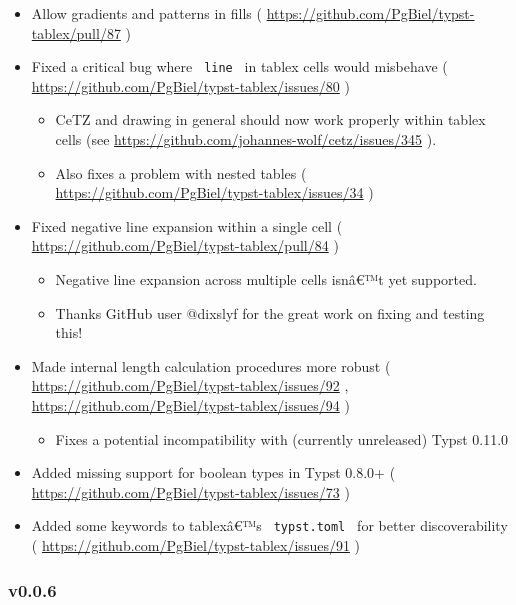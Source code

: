 \begin{itemize}
\tightlist
\item
  Allow gradients and patterns in fills (
  \url{https://github.com/PgBiel/typst-tablex/pull/87} )
\item
  Fixed a critical bug where \texttt{\ line\ } in tablex cells would
  misbehave ( \url{https://github.com/PgBiel/typst-tablex/issues/80} )

  \begin{itemize}
  \tightlist
  \item
    CeTZ and drawing in general should now work properly within tablex
    cells (see \url{https://github.com/johannes-wolf/cetz/issues/345} ).
  \item
    Also fixes a problem with nested tables (
    \url{https://github.com/PgBiel/typst-tablex/issues/34} )
  \end{itemize}
\item
  Fixed negative line expansion within a single cell (
  \url{https://github.com/PgBiel/typst-tablex/pull/84} )

  \begin{itemize}
  \tightlist
  \item
    Negative line expansion across multiple cells isnâ€™t yet supported.
  \item
    Thanks GitHub user @dixslyf for the great work on fixing and testing
    this!
  \end{itemize}
\item
  Made internal length calculation procedures more robust (
  \url{https://github.com/PgBiel/typst-tablex/issues/92} ,
  \url{https://github.com/PgBiel/typst-tablex/issues/94} )

  \begin{itemize}
  \tightlist
  \item
    Fixes a potential incompatibility with (currently unreleased) Typst
    0.11.0
  \end{itemize}
\item
  Added missing support for boolean types in Typst 0.8.0+ (
  \url{https://github.com/PgBiel/typst-tablex/issues/73} )
\item
  Added some keywords to tablexâ€™s \texttt{\ typst.toml\ } for better
  discoverability (
  \url{https://github.com/PgBiel/typst-tablex/issues/91} )
\end{itemize}

\subsubsection{v0.0.6}\label{v0.0.6}


